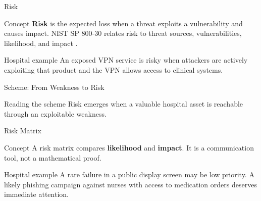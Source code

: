 \documentclass[presentation]{beamer}
\begin{document}
\begin{frame}[c]{Risk}
\begin{block}{Concept}
\textbf{Risk} is the expected loss when a threat exploits a vulnerability and causes impact.
NIST SP 800-30 relates risk to threat sources, vulnerabilities, likelihood, and impact
\cite{nist_sp_800_30}.
\end{block}

\begin{exampleblock}{Hospital example}
An exposed VPN service is risky when attackers are actively exploiting that product and the VPN
allows access to clinical systems.
\end{exampleblock}
\end{frame}

\begin{frame}[c]{Scheme: From Weakness to Risk}
\begin{center}
\end{center}

\begin{block}{Reading the scheme}
Risk emerges when a valuable hospital asset is reachable through an exploitable weakness.
\end{block}
\end{frame}

\begin{frame}[c]{Risk Matrix}
\begin{block}{Concept}
A risk matrix compares \textbf{likelihood} and \textbf{impact}. It is a communication tool, not a
mathematical proof.
\end{block}

\begin{exampleblock}{Hospital example}
A rare failure in a public display screen may be low priority. A likely phishing campaign against
nurses with access to medication orders deserves immediate attention.
\end{exampleblock}
\end{frame}
\end{document}
